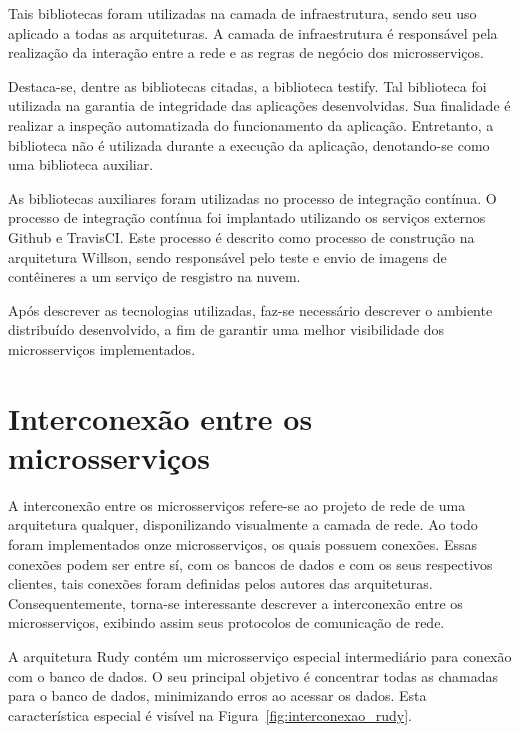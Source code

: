 Tais bibliotecas foram utilizadas na camada de infraestrutura, sendo seu uso aplicado a todas as arquiteturas.
%
A camada de infraestrutura é responsável pela realização da interação entre a rede e as regras de negócio dos microsserviços.


Destaca-se, dentre as bibliotecas citadas, a biblioteca testify.
%
Tal biblioteca foi utilizada na garantia de integridade das aplicações desenvolvidas.
%
Sua finalidade é realizar a inspeção automatizada do funcionamento da aplicação.
%
Entretanto, a biblioteca não é utilizada durante a execução da aplicação, denotando-se como uma biblioteca auxiliar.



As bibliotecas auxiliares foram utilizadas no processo de integração contínua.
%
O processo de integração contínua foi implantado utilizando os serviços externos Github e TravisCI.
%
Este processo é descrito como processo de construção na arquitetura Willson, sendo responsável pelo teste e envio de imagens de contêineres a um serviço de resgistro na nuvem.




Após descrever as tecnologias utilizadas, faz-se necessário descrever o ambiente distribuído desenvolvido, a fim de garantir uma melhor visibilidade dos microsserviços implementados.



\section{Interconexão entre os microsserviços}
\label{sec:interconexao}

A interconexão entre os microsserviços refere-se ao projeto de rede de uma arquitetura qualquer, disponilizando visualmente a camada de rede.
%
Ao todo foram implementados onze microsserviços, os quais possuem conexões.
%
Essas conexões podem ser entre sí, com os bancos de dados e com os seus respectivos clientes, tais conexões foram definidas pelos autores das arquiteturas.
%
Consequentemente, torna-se interessante descrever a interconexão entre os microsserviços, exibindo assim seus protocolos de comunicação de rede.



A arquitetura Rudy contém um microsserviço especial intermediário para conexão com o banco de dados.
%
O seu principal objetivo é concentrar todas as chamadas para o banco de dados, minimizando erros ao acessar os dados.
%
Esta característica especial é visível na Figura~\ref{fig:interconexao_rudy}.



